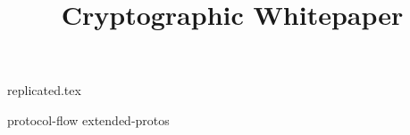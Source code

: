 \documentclass{llncs}
\begin{document}
%

\title{Cryptographic Whitepaper}
\author{}


\maketitle
\thispagestyle{fancy}




{replicated.tex}


\newpage
%



\clearpage
\appendix


{protocol-flow}
{extended-protos}
\end{document}

